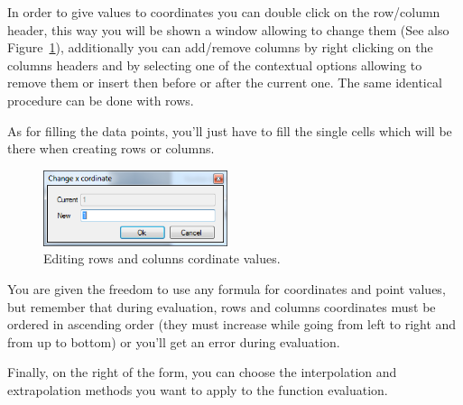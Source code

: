 In order to give values to coordinates you can double click on the row/column header, this way you will be shown a window allowing to change them (See also Figure~\ref{fig.PFunction2DColumnEdit}), additionally you can add/remove columns by right clicking on the columns headers and by selecting one of the contextual options allowing to remove them or insert then before or after the current one. The same identical procedure can be done with rows.

As for filling the data points, you'll just have to fill the single cells which will be there when creating rows or columns.

\begin{figure}[h]
\begin{center}
\includegraphics[width=0.48\textwidth]{./images/PFunction2DColumnEdit.png}
\caption{Editing rows and colunns cordinate values.}
\label{fig.PFunction2DColumnEdit}
\end{center}
\end{figure}

You are given the freedom to use any formula for coordinates and point values, but remember that during evaluation, rows and columns coordinates must be ordered in ascending order (they must increase while going from left to right and from up to bottom) or you'll get an error during evaluation.

Finally, on the right of the form, you can choose the interpolation and extrapolation methods you want to apply to the function evaluation.



